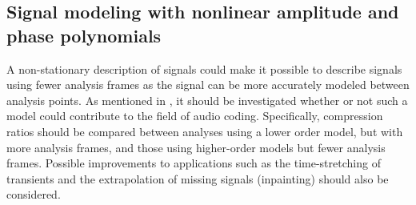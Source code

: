\subsection{Signal modeling with nonlinear amplitude and phase polynomials}

A non-stationary description of signals could make it possible to describe
signals using fewer analysis frames as the signal can be more accurately modeled
between analysis points. As mentioned in \cite{betser2009sinusoidal}, it should
be investigated whether or not such a model could contribute to the field of audio
coding. Specifically, compression ratios should be compared between analyses
using a lower order model, but with more analysis frames, and those using higher-order
models but fewer analysis frames. Possible improvements to applications such as
the time-stretching of transients and the extrapolation of missing signals
(inpainting) should also be considered.
